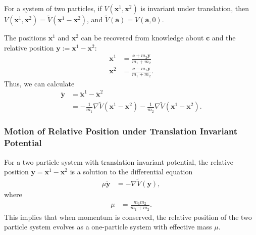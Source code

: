 \documentclass[10pt]{extarticle}
\theoremstyle{plain}
\theoremstyle{definition}
\theoremstyle{remark}
\renewcommand{\newline}{\hfill\break}
\begin{document}
  For a system of two particles, if $V( \mathbf{x}^1, \mathbf{x}^2 )$ is invariant under translation, then $V( \mathbf{x}^1, \mathbf{x}^2 ) = \tilde{V}( \mathbf{x}^1- \mathbf{x}^2 )$, and $\tilde{V}(\mathbf{a}) = V\left(\mathbf{a},0\right)$.\newline

  The positions $\mathbf{x}^1$ and $\mathbf{x}^2$ can be recovered from knowledge about $\mathbf{c}$ and the relative position $\mathbf{y} := \mathbf{x}^1 - \mathbf{x}^2$:
  \begin{align*}
    \mathbf{x}^1 &= \frac{\mathbf{c} + m_2\mathbf{y}}{m_1 + m_2}\\
    \mathbf{x}^2 &= \frac{\mathbf{c} - m_1\mathbf{y}}{m_1 + m_2}.
  \end{align*}
  Thus, we can calculate
  \begin{align*}
    \mathbf{\ddot{y}} &= \mathbf{\ddot{x}}^1 - \mathbf{\ddot{x}}^2\\
                      &= -\frac{1}{m_1}\nabla\tilde{V}\left(\mathbf{x}^1 - \mathbf{x}^2\right) - \frac{1}{m_2}\nabla\tilde{V}\left(\mathbf{x}^1 - \mathbf{x}^2\right).
  \end{align*}
  \subsubsection{Motion of Relative Position under Translation Invariant Potential}%
  For a two particle system with translation invariant potential, the relative position $\mathbf{y} = \mathbf{x}^1 - \mathbf{x}^2$ is a solution to the differential equation
  \begin{align*}
    \mu\mathbf{\ddot{y}} &= -\nabla\tilde{V}(\mathbf{y}),
  \end{align*}
  where
  \begin{align*}
    \mu &= \frac{m_1m_2}{m_1 + m_2}.
  \end{align*}
  This implies that when momentum is conserved, the relative position of the two particle system evolves as a one-particle system with effective mass $\mu$.
\end{document}
